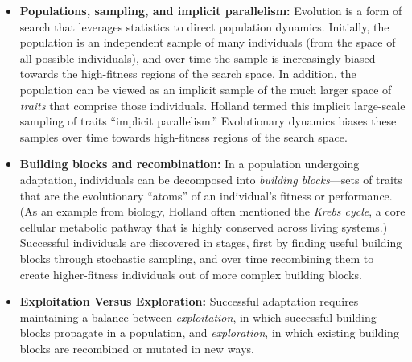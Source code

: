 \documentclass{sig-alternate}
\begin{document}
\begin{itemize}
\item{\bf Populations, sampling, and implicit parallelism:} 
  Evolution is a form of search that leverages statistics to
  direct population dynamics.  Initially, the population is an 
 independent sample of many individuals (from the space of all possible
  individuals), and over time the sample is increasingly biased
  towards the high-fitness regions of the search space.  In addition,
the population can be viewed as an
  implicit sample of the much larger space of \emph{traits} that
  comprise those individuals.  Holland termed this implicit
  large-scale sampling of traits ``implicit parallelism.''
  Evolutionary dynamics biases these samples over time towards
  high-fitness regions of the search space.

\item{\bf Building blocks and recombination:} 
  In a population undergoing adaptation,
  individuals can be decomposed into \emph{building blocks}---sets of
  traits that are the evolutionary ``atoms'' of an individual's
  fitness or performance. (As an example from biology, Holland often mentioned
  the \emph{Krebs cycle}, a core cellular metabolic
  pathway that is highly conserved across living systems.)   Successful individuals
  are discovered in stages, first by finding useful
  building blocks through stochastic sampling, and over
  time recombining them to create higher-fitness individuals out of
  more complex building blocks.




\item{\bf Exploitation Versus Exploration:} Successful adaptation
  requires maintaining a balance between \emph{exploitation}, in which
  successful building blocks propagate in a population, and
  \emph{exploration}, in which existing building blocks are recombined
  or mutated in new ways.

\end{itemize} 
\end{document}
